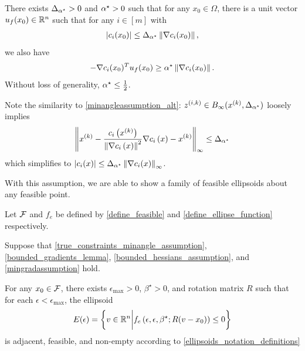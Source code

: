 \begin{assumption}
\label{true_constraints_minangle_assumption}
There exists ${\Delta_{\alpha^{\star}}} > 0$ and ${ \alpha^{\star} } > 0$ such that for any $x_0 \in \Omega$,
there is a unit vector ${u_{f}(x_0)} \in \mathbb R^n$ such that 
for any $i \in [m]$ with
\begin{align*}
\left|c_i(x_0)\right| \le {\Delta_{\alpha^{\star}}} \left\|\nabla c_i(x_0)\right\|,
\end{align*}
we also have
\begin{align*}
-\nabla c_i(x_0)^T {u_{f}(x_0)} \ge { \alpha^{\star} } \left\| \nabla c_i(x_0) \right\|.
\end{align*}
Without loss of generality, ${ \alpha^{\star} } \le \frac 1 2$.
\end{assumption}

Note the similarity to \cref{minangleassumption_alt}:
${z^{(i, k)}} \in B_{\infty}(x^{(k)}, {\Delta_{\alpha^{\star}}})$ loosely implies
\begin{align*}
\left\|x^{(k)} - \frac{c_i\left(x^{(k)}\right)}{\left\|\nabla c_i\left(x\right)\right\|^2} \nabla c_i\left(x\right)  - x^{(k)}\right\|_{\infty} \le {\Delta_{\alpha^{\star}}}
\end{align*}
which simplifies to
$\left|c_i(x)\right| \le {\Delta_{\alpha^{\star}}} \left\|\nabla c_i(x)\right\|_{\infty}$.

With this assumption, we are able to show a family of feasible ellipsoids about any feasible point.

\begin{theorem}
\label{nonconvex_ellipsoid_existence}
Let ${\mathcal F}$ and $f_e$ be defined by \cref{define_feasible} and \cref{define_ellipse_function} respectively.

Suppose that 
\cref{true_constraints_minangle_assumption},
\cref{bounded_gradients_lemma},
\cref{bounded_hessians_assumption},
and \cref{mingradassumption} hold.

For any $x_0 \in {\mathcal F}$,
there exists $\epsilon_{\textrm{max}} > 0$, $\beta^{\star}>0$, and rotation matrix $R$ such that for each $\epsilon < \epsilon_{\textrm{max}}$, the ellipsoid
\begin{align*}
E(\epsilon) = \left\{v \in \mathbb R^n \bigg| f_e\left(\epsilon, \epsilon, \beta^{\star}; R(v - x_0)\right) \le 0\right\}
\end{align*}
is adjacent, feasible, and non-empty according to \cref{ellipsoids_notation_definitions}
\end{theorem}

